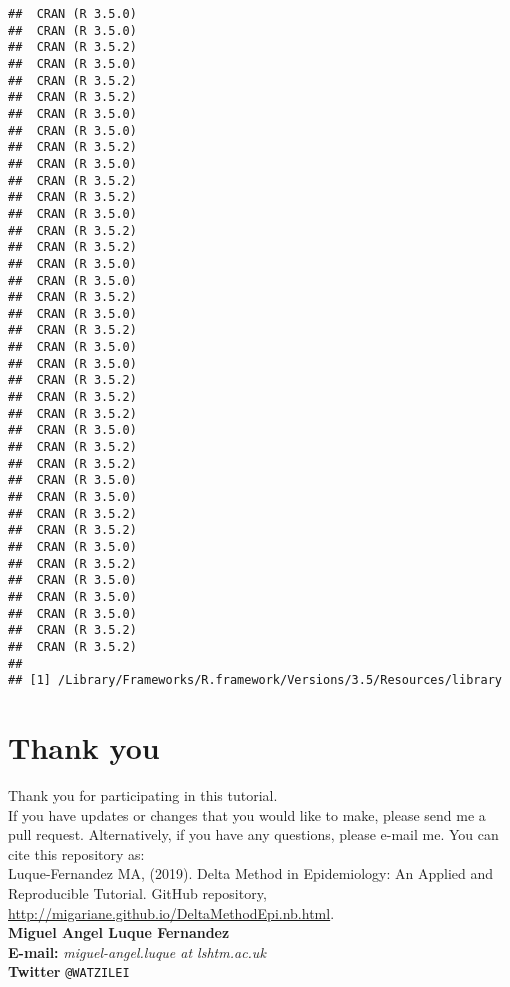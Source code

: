 \documentclass[]{article}
\begin{document}
\begin{verbatim}
##  CRAN (R 3.5.0)                       
##  CRAN (R 3.5.0)                       
##  CRAN (R 3.5.2)                       
##  CRAN (R 3.5.0)                       
##  CRAN (R 3.5.2)                       
##  CRAN (R 3.5.2)                       
##  CRAN (R 3.5.0)                       
##  CRAN (R 3.5.0)                       
##  CRAN (R 3.5.2)                       
##  CRAN (R 3.5.0)                       
##  CRAN (R 3.5.2)                       
##  CRAN (R 3.5.2)                       
##  CRAN (R 3.5.0)                       
##  CRAN (R 3.5.2)                       
##  CRAN (R 3.5.2)                       
##  CRAN (R 3.5.0)                       
##  CRAN (R 3.5.0)                       
##  CRAN (R 3.5.2)                       
##  CRAN (R 3.5.0)                       
##  CRAN (R 3.5.2)                       
##  CRAN (R 3.5.0)                       
##  CRAN (R 3.5.0)                       
##  CRAN (R 3.5.2)                       
##  CRAN (R 3.5.2)                       
##  CRAN (R 3.5.2)                       
##  CRAN (R 3.5.0)                       
##  CRAN (R 3.5.2)                       
##  CRAN (R 3.5.2)                       
##  CRAN (R 3.5.0)                       
##  CRAN (R 3.5.0)                       
##  CRAN (R 3.5.2)                       
##  CRAN (R 3.5.2)                       
##  CRAN (R 3.5.0)                       
##  CRAN (R 3.5.2)                       
##  CRAN (R 3.5.0)                       
##  CRAN (R 3.5.0)                       
##  CRAN (R 3.5.0)                       
##  CRAN (R 3.5.2)                       
##  CRAN (R 3.5.2)                       
## 
## [1] /Library/Frameworks/R.framework/Versions/3.5/Resources/library
\end{verbatim}

\hypertarget{thank-you}{%
\section{Thank you}\label{thank-you}}

Thank you for participating in this tutorial.\\
If you have updates or changes that you would like to make, please send
me a pull request. Alternatively, if you have any questions, please
e-mail me. You can cite this repository as:\\
Luque-Fernandez MA, (2019). Delta Method in Epidemiology: An Applied and
Reproducible Tutorial. GitHub repository,
\url{http://migariane.github.io/DeltaMethodEpi.nb.html}.\\
\textbf{Miguel Angel Luque Fernandez}\\
\textbf{E-mail:} \emph{miguel-angel.luque at lshtm.ac.uk}\\
\textbf{Twitter} \texttt{@WATZILEI}
\end{document}
